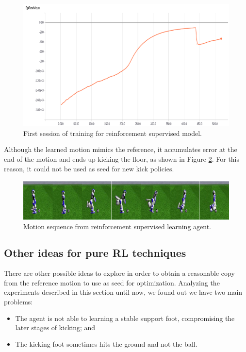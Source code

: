 \begin{figure}[!htbp]
	\centering
	\includegraphics[width=1.0\textwidth]{Cap6/rlsuprewardcurves.eps}
	\caption{First session of training for reinforcement supervised model.}
	\label{fig:rlsupcurves}
\end{figure}

Although the learned motion mimics the reference, it accumulates error at the end of the motion and ends up kicking the floor, as shown in Figure \ref{fig:rlsupmotionsequence}. For this reason, it could not be used as seed for new kick policies.

\begin{figure}[!htbp]
	\centering
	\includegraphics[width=1.0\textwidth]{Cap6/rlsupmotionsequence.eps}
	\caption{Motion sequence from reinforcement supervised learning agent.}
	\label{fig:rlsupmotionsequence}
\end{figure}

\subsection{Other ideas for pure RL techniques}

There are other possible ideas to explore in order to obtain a reasonable copy from the reference motion to use as seed for optimization. Analyzing the experiments described in this section until now, we found out we have two main problems:

\begin{itemize}
	\item The agent is not able to learning a stable support foot, compromising the later stages of kicking; and
	\item The kicking foot sometimes hits the ground and not the ball.
\end{itemize}

